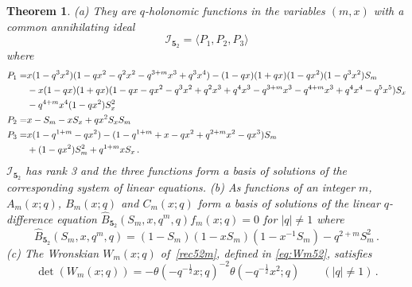 \documentclass[12pt,reqno]{amsart}
\newtheorem{theorem}{Theorem}
\theoremstyle{definition}
\def\calI{\mathcal I}
\def\calI{\mathcal I}
\def\th{\theta}
\def\Bhat{\widehat{B}}
\def\md{\mathbf}
\newcommand{\knot}[1]{\md{#1}}
\begin{document}
\begin{theorem}
  \label{thm.52b}
  \rm{(a)} They are $q$-holonomic functions in the variables $(m,x)$
  with a common annihilating ideal
  \begin{equation}
    \label{ann52}
    \calI_{\knot{5}_2} = \langle P_1, P_2, P_3 \rangle
  \end{equation}
  where
  {\tiny
    \begin{subequations}
      \begin{align}
        \label{52P1}
        P_1 =
        & x (1 - q^3 x^2)
          (1 - q x^2 - q^2 x^2 - q^{3 + m} x^3 + q^3 x^4)
          -(1 - q x) (1 + q x) (1 - q x^2) (1 - q^3 x^2)
          S_m \\ \notag
        & -x(1-qx)(1+qx)
          (1-qx-qx^2-q^3x^2+q^2x^3+q^4x^3-q^{3+m}x^3-q^{4+m}x^3
          +q^4x^4-q^5x^5 ) S_x\\ \notag
        & - q^{4+m} x^4(1 - q x^2) S_x^2 
        \\
      \label{52P2}
        P_2 =
        & x  -  S_m - x S_x + q x^2 S_x S_m 
        \\
      \label{52P3}
        P_3 =
        & x (1 -q^{1 + m} - q x^2)  - 
          (1 - q^{1 + m} +  x - q x^2 + 
          q^{2 + m} x^2 - q x^3) S_m \\ \notag
        &+ (1 - q x^2) S_m^2 +  q^{1+m} x S_x \,.
      \end{align}    
    \end{subequations}
  }
  $\calI_{\knot{5}_2}$ has rank 3 and the three functions form a basis of
  solutions of the corresponding system of linear equations.  \newline
  \rm{(b)} As functions of an integer $m$, $A_m(x;q)$, $B_m(x;q)$ and
  $C_m(x;q)$ form a basis of solutions of the linear $q$-difference
  equation $\Bhat_{\knot{5}_2}(S_m,x,q^m,q) f_m(x;q) = 0$ for $|q| \neq 1$ where 
  \begin{equation}
    \label{rec52m}
    \Bhat_{\knot{5}_2}(S_m,x,q^m,q) = (1-S_m)(1-xS_m)(1-x^{-1}S_m) - q^{2+m} S_m^2 \,.
  \end{equation}
  \rm{(c)} The Wronskian $W_m(x;q)$ of~\eqref{rec52m}, 
  defined in \eqref{eq:Wm52}, satisfies 
  \begin{equation}
    \label{W520}
    \det(W_m(x;q)) =
    -\th(-q^{-\frac{1}{2}}x; q)^{-2} \th(-q^{-\frac{1}{2}}x^2; q)
     \qquad
    (|q| \neq 1) \,.
  \end{equation}

\end{theorem}
\end{document}
